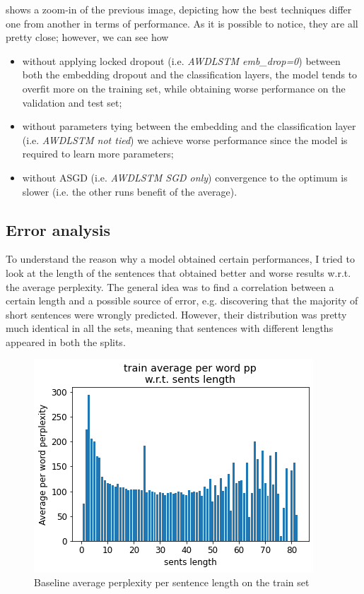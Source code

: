  shows a zoom-in of the previous image, depicting how the best techniques differ one from another in terms of performance. As it is possible to notice, they are all pretty close; however, we can see how
\begin{itemize}
\item without applying locked dropout (i.e. \textit{AWDLSTM emb\_drop=0}) between both the embedding dropout and the classification layers, the model tends to overfit more on the training set, while obtaining worse performance on the validation and test set;
\item without parameters tying between the embedding and the classification layer (i.e. \textit{AWDLSTM not tied}) we achieve worse performance since the model is required to learn more parameters;
\item without ASGD (i.e. \textit{AWDLSTM SGD only}) convergence to the optimum is slower (i.e. the other runs benefit of the average).
\end{itemize}

\subsection{Error analysis}
To understand the reason why a model obtained certain performances, I tried to look at the length of the sentences that obtained better and worse results w.r.t. the average perplexity. The general idea was to find a correlation between a certain length and a possible source of error, e.g. discovering that the majority of short sentences were wrongly predicted. However, their distribution was pretty much identical in all the sets, meaning that sentences with different lengths appeared in both the splits.

\begin{figure}[!t]
    \centering
    \includegraphics[scale=0.40]{assets/baseline_train_pp_per_length.png}
    \vspace{-1.0em}
    \caption{Baseline average perplexity per sentence length on the train set}
    \vspace{-1.0em}
    \label{fig:baseline-train-pp}
\end{figure}

